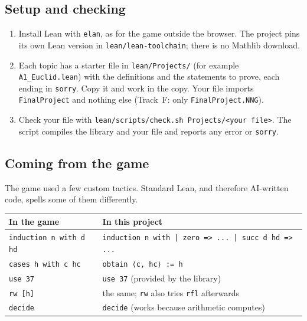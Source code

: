 \documentclass[11pt]{article}
\newcommand{\lean}[1]{\texttt{#1}}
\begin{document}
\subsection{Setup and checking}
\begin{enumerate}
\item Install Lean with \lean{elan}, as for the game outside the browser. The project pins its
  own Lean version in \lean{lean/lean-toolchain}; there is no Mathlib download.
\item Each topic has a starter file in \lean{lean/Projects/} (for example
  \lean{A1\_Euclid.lean}) with the definitions and the statements to prove, each ending in
  \lean{sorry}. Copy it and work in the copy. Your file imports \lean{FinalProject} and nothing else (Track~F: only
  \lean{FinalProject.NNG}).
\item Check your file with \lean{lean/scripts/check.sh Projects/<your file>}. The script compiles
  the library and your file and reports any error or \lean{sorry}.
\end{enumerate}

\subsection{Coming from the game}
The game used a few custom tactics. Standard Lean, and therefore AI-written code, spells some of
them differently.

\begin{tabular}{@{}ll@{}}
\toprule
In the game & In this project \\
\midrule
\lean{induction n with d hd} & \lean{induction n with | zero => ... | succ d hd => ...} \\
\lean{cases h with c hc} & \lean{obtain ⟨c, hc⟩ := h} \\
\lean{use 37} & \lean{use 37} (provided by the library) \\
\lean{rw [h]} & the same; \lean{rw} also tries \lean{rfl} afterwards \\
\lean{decide} & \lean{decide} (works because arithmetic computes) \\
\bottomrule
\end{tabular}
\end{document}
